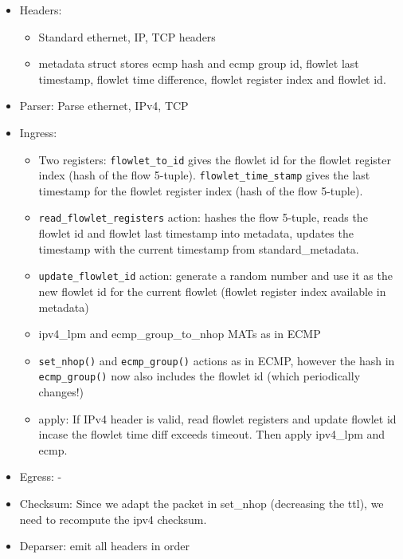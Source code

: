 \documentclass[11pt,oneside,a4paper]{article}
\begin{document}
\vspace{-\topsep}
\begin{itemize}
	\setlength{\itemsep}{0pt}
	\setlength{\parskip}{0pt}
	\item Headers:
	\begin{itemize}
		\setlength{\itemsep}{0pt}
		\setlength{\parskip}{0pt}
		\item Standard ethernet, IP, TCP headers
		\item metadata struct stores ecmp hash and ecmp group id, flowlet last timestamp, flowlet time difference, flowlet register index and flowlet id.
	\end{itemize}
	\item Parser: Parse ethernet, IPv4, TCP
	\item Ingress:
	\begin{itemize}
		\setlength{\itemsep}{0pt}
		\setlength{\parskip}{0pt}
		\item Two registers: \texttt{flowlet\_to\_id} gives the flowlet id for the flowlet register index (hash of the flow 5-tuple). \texttt{flowlet\_time\_stamp} gives the last timestamp for the flowlet register index (hash of the flow 5-tuple).
		\item \texttt{read\_flowlet\_registers} action: hashes the flow 5-tuple, reads the flowlet id and flowlet last timestamp into metadata, updates the timestamp with the current timestamp from standard\_metadata. 
		\item \texttt{update\_flowlet\_id} action: generate a random number and use it as the new flowlet id for the current flowlet (flowlet register index available in metadata)
		\item ipv4\_lpm and ecmp\_group\_to\_nhop MATs as in ECMP
		\item \texttt{set\_nhop()} and \texttt{ecmp\_group()} actions as in ECMP, however the hash in \texttt{ecmp\_group()} now also includes the flowlet id (which periodically changes!)
		\item apply: If IPv4 header is valid, read flowlet registers and update flowlet id incase the flowlet time diff exceeds timeout. Then apply ipv4\_lpm and ecmp.
	\end{itemize}
	\item Egress: -
	\item Checksum: Since we adapt the packet in set\_nhop (decreasing the ttl), we need to recompute the ipv4 checksum.
	\item Deparser: emit all headers in order
\end{itemize}
\vspace{-\topsep}
\end{document}
